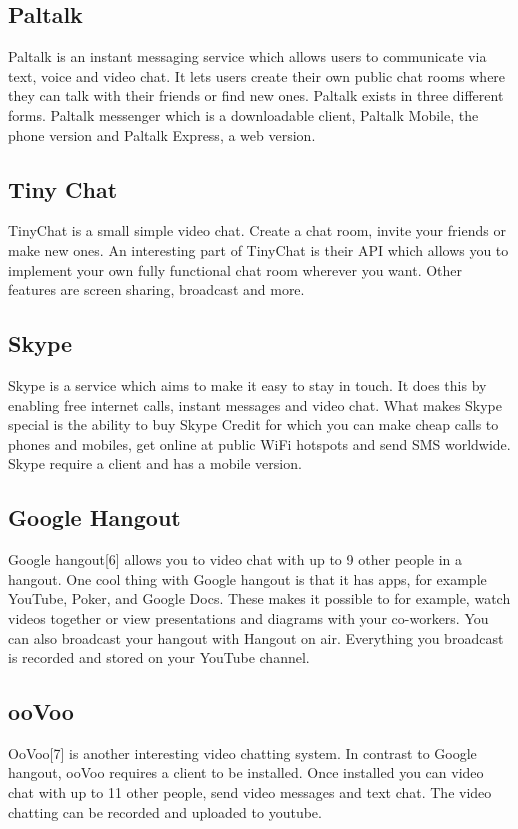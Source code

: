 \documentclass[12pt, titlepage]{article}
\begin{document}
\subsection{Paltalk}
Paltalk is an instant messaging service which allows users to communicate via text, voice and video chat. It lets users create their own public chat rooms where they can talk with their friends or find new ones. Paltalk exists in three different forms. Paltalk messenger which is a downloadable client, Paltalk Mobile, the phone version and Paltalk Express, a web version.
\subsection{Tiny Chat}
TinyChat is a small simple video chat. Create a chat room, invite your friends or make new ones. An interesting part of TinyChat is their API which allows you to implement your own fully functional chat room wherever you want. Other features are screen sharing, broadcast and more.
\subsection{Skype}
Skype is a service which aims to make it easy to stay in touch. It does this by enabling free internet calls, instant messages and video chat. What makes Skype special is the ability to buy Skype Credit for which you can make cheap calls to phones and mobiles, get online at public WiFi hotspots and send SMS worldwide. Skype require a client and has a mobile version.
\subsection{Google Hangout}
Google hangout[6] allows you to video chat with up to 9 other people in a hangout. One cool thing with Google hangout is that it has apps, for example YouTube, Poker, and Google Docs. These makes it possible to for example, watch videos together or view presentations and diagrams with your co-workers. You can also broadcast your hangout with Hangout on air. Everything you broadcast is recorded and stored on your YouTube channel.
\subsection{ooVoo}
OoVoo[7] is another interesting video chatting system. In contrast to Google hangout, ooVoo requires a client to be installed. Once installed you can video chat with up to 11 other people, send video messages and text chat. The video chatting can be recorded and uploaded to youtube.
\end{document}
